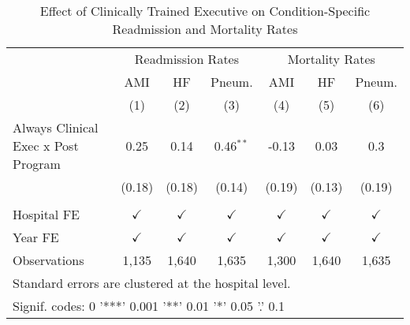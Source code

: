 \begin{table}[ht!]

\caption{\label{tab:results_by_condition}Effect of Clinically Trained Executive on Condition-Specific Readmission and Mortality Rates}
\centering
\begin{tabular}[t]{lcccccc}
\toprule
\multicolumn{1}{c}{ } & \multicolumn{3}{c}{Readmission Rates} & \multicolumn{3}{c}{Mortality Rates} \\
\cmidrule(l{3pt}r{3pt}){2-4} \cmidrule(l{3pt}r{3pt}){5-7}
\addlinespace[0.3em]
\multicolumn{1}{c}{ } & \multicolumn{1}{c}{AMI} & \multicolumn{1}{c}{HF} & \multicolumn{1}{c}{Pneum.} & \multicolumn{1}{c}{AMI} & \multicolumn{1}{c}{HF} & \multicolumn{1}{c}{Pneum.} \\
\cmidrule(l{3pt}r{3pt}){2-2} \cmidrule(l{3pt}r{3pt}){3-3} \cmidrule(l{3pt}r{3pt}){4-4} \cmidrule(l{3pt}r{3pt}){5-5} \cmidrule(l{3pt}r{3pt}){6-6} \cmidrule(l{3pt}r{3pt}){7-7}
 & (1) & (2) & (3) & (4) & (5) & (6)\\
\midrule
Always Clinical Exec x Post Program & 0.25 & 0.14 & 0.46$^{**}$ & -0.13 & 0.03 & 0.3\\
 & (0.18) & (0.18) & (0.14) & (0.19) & (0.13) & (0.19)\\
 &  &  &  &  &  & \\
Hospital FE & $\checkmark$ & $\checkmark$ & $\checkmark$ & $\checkmark$ & $\checkmark$ & $\checkmark$\\
Year FE & $\checkmark$ & $\checkmark$ & $\checkmark$ & $\checkmark$ & $\checkmark$ & $\checkmark$\\
\addlinespace
Observations & 1,135 & 1,640 & 1,635 & 1,300 & 1,640 & 1,635\\
\bottomrule
\multicolumn{7}{l}{\textsuperscript{} Standard errors are clustered at the hospital level.}\\
\multicolumn{7}{l}{\textsuperscript{} Signif. codes: 0 '***' 0.001 '**' 0.01 '*' 0.05 '.' 0.1}\\
\end{tabular}
\end{table}
